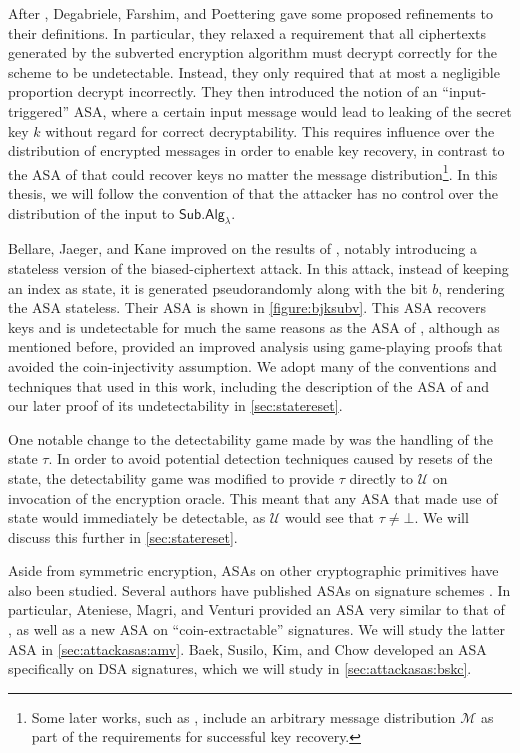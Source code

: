 After \cite{C:BelPatRog14}, Degabriele, Farshim, and Poettering \cite{FSE:DegFarPoe15} gave some proposed refinements to their definitions. In particular, they relaxed a requirement that all ciphertexts generated by the subverted encryption algorithm must decrypt correctly for the scheme to be undetectable. Instead, they only required that at most a negligible proportion decrypt incorrectly. They then introduced the notion of an ``input-triggered'' ASA, where a certain input message would lead to leaking of the secret key $k$ without regard for correct decryptability. This requires influence over the distribution of encrypted messages in order to enable key recovery, in contrast to the ASA of \cite{C:BelPatRog14} that could recover keys no matter the message distribution\footnote{Some later works, such as \cite{CCS:BelJaeKan15}, include an arbitrary message distribution $\mathcal{M}$ as part of the requirements for successful key recovery.}. In this thesis, we will follow the convention of \cite{C:BelPatRog14} that the attacker has no control over the distribution of the input to $\mathsf{Sub.Alg}_\lambda$.

Bellare, Jaeger, and Kane \cite{CCS:BelJaeKan15} improved on the results of \cite{C:BelPatRog14}, notably introducing a stateless version of the biased-ciphertext attack. In this attack, instead of keeping an index as state, it is generated pseudorandomly along with the bit $b$, rendering the ASA stateless. Their ASA is shown in \autoref{figure:bjksubv}. This ASA recovers keys and is undetectable for much the same reasons as the ASA of \cite{C:BelPatRog14}, although as mentioned before, \cite{CCS:BelJaeKan15} provided an improved analysis using game-playing proofs that avoided the coin-injectivity assumption. We adopt many of the conventions and techniques that \cite{CCS:BelJaeKan15} used in this work, including the description of the ASA of \cite{C:BelPatRog14} and our later proof of its undetectability in \autoref{sec:statereset}.

One notable change to the detectability game made by \cite{CCS:BelJaeKan15} was the handling of the state $\tau$. In order to avoid potential detection techniques caused by resets of the state, the detectability game was modified to provide $\tau$ directly to $\mathcal{U}$ on invocation of the encryption oracle. This meant that any ASA that made use of state would immediately be detectable, as $\mathcal{U}$ would see that $\tau \neq \bot$. We will discuss this further in \autoref{sec:statereset}.

Aside from symmetric encryption, ASAs on other cryptographic primitives have also been studied. Several authors have published ASAs on signature schemes \cite{CCS:AteMagVen15,BSKC2019,ACISP:LCWW18}. In particular, Ateniese, Magri, and Venturi \cite{CCS:AteMagVen15} provided an ASA very similar to that of \cite{CCS:BelJaeKan15}, as well as a new ASA on ``coin-extractable'' signatures. We will study the latter ASA in \autoref{sec:attackasas:amv}. Baek, Susilo, Kim, and Chow \cite{BSKC2019} developed an ASA specifically on DSA signatures, which we will study in \autoref{sec:attackasas:bskc}.

